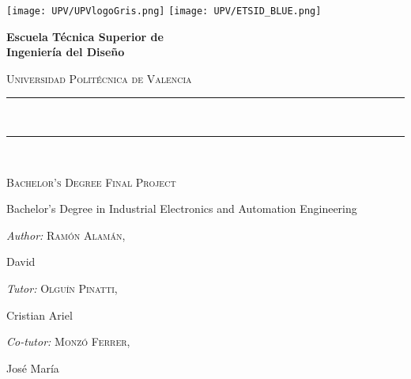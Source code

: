 	\centering
	\texttt{[image: UPV/UPVlogoGris.png]}
	\hfill{}
	\texttt{[image: UPV/ETSID\_BLUE.png]}
	\\[1cm]
	{\bfseries\LARGE {Escuela T\'ecnica Superior de\\ Ingenier\'ia del Dise\~{n}o} \par}
	{\scshape\Large {Universidad Polit\'ecnica de Valencia} \par}
	\vfill{}
	\textcolor{coloretsid}{\rule{\linewidth}{0.2 mm}} \\[0.4 cm]
    \def\baselinestretch{1.5}\selectfont
	{\scshape\huge{\thetitle }}
	\textcolor{coloretsid}{\rule{\linewidth}{0.2 mm}} \\[0.4 cm]
	{\scshape\Large {Bachelor's Degree Final Project} \par}
    {\normalsize {Bachelor's Degree in Industrial Electronics and Automation Engineering}}
	\vfill
    \raggedright
	{\normalsize\emph{{Author:}}}
	{\normalsize\scshape {Ram\'on Alam\'an,}} 
	{\normalsize{David}\par}
    {\normalsize\emph{{Tutor:}}}
	{\normalsize\scshape {Olguín Pinatti,}} 
	{\normalsize{Cristian Ariel}\par}
    {\normalsize\emph{{Co-tutor:}}}
	{\normalsize\scshape {Monzó Ferrer,}} 
	{\normalsize{José María}\par}

\begin{titlepage}
    \maketitle
\end{titlepage}
